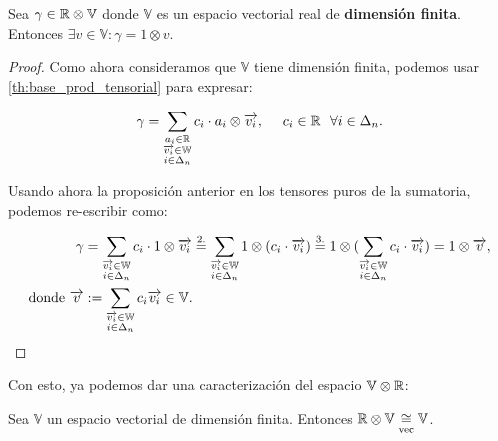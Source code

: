 \begin{proposicion} \label{prop:r_otimes_v_es_v}
    Sea $\gamma \in \mathbb{R} \otimes \mathbb{V}$ donde $\mathbb{V}$ es un espacio vectorial real de \textbf{dimensión finita}. Entonces $\exists v \in \mathbb{V}: \gamma = 1 \otimes v$.
\end{proposicion}
\begin{proof}
    Como ahora consideramos que $\mathbb{V}$ tiene dimensión finita, podemos usar \ref{th:base_prod_tensorial} para expresar:

    \begin{equation}
        \gamma = \sum_{\substack{a_i \in \mathbb{R}\\ \overrightarrow{v_i} \in \mathbb{W}\\ i \in \Delta_{n}}} c_{i} \cdot a_i \otimes \overrightarrow{v_i}, \ \ \ \  c_{i} \in \mathbb{R} \ \  \forall i \in \Delta_{n}.
    \end{equation}

    Usando ahora la proposición anterior en los tensores puros de la sumatoria, podemos re-escribir como:

    \begin{equation}
        \begin{split}
            \gamma &= \sum_{\substack{\overrightarrow{v_i} \in \mathbb{W}\\ i \in \Delta_{n}}} c_{i} \cdot 1 \otimes \overrightarrow{v_i} \stackrel{\text{2.}}{=} \sum_{\substack{\overrightarrow{v_i} \in \mathbb{W}\\ i \in \Delta_{n}}} 1 \otimes (c_{i} \cdot \overrightarrow{v_i}) \stackrel{\text{3.}}{=} 1 \otimes ( \sum_{\substack{\overrightarrow{v_i} \in \mathbb{W} \\ i \in \Delta_{n}}} c_{i} \cdot \overrightarrow{v_i} ) = 1 \otimes \overrightarrow{v}, \\
            \text{donde } \overrightarrow{v} &:= \sum_{\substack{\overrightarrow{v_i} \in \mathbb{W}\\ i \in \Delta_{n}}} c_{i} \overrightarrow{v_i} \in \mathbb{V}. \\
        \end{split}
    \end{equation}

\end{proof}

Con esto, ya podemos dar una caracterización del espacio $\mathbb{V} \otimes \mathbb{R}$:

\begin{proposicion}
    Sea $\mathbb{V}$ un espacio vectorial de dimensión finita. Entonces $\mathbb{R} \otimes \mathbb{V} \underset{\text{vec}}{\cong} \mathbb{V}$.
\end{proposicion}

